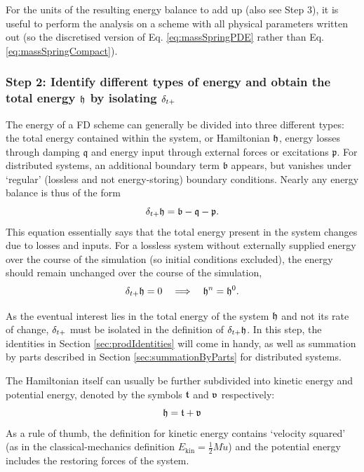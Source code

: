 {{For the units of the resulting energy balance to add up (also see Step 3), it is useful to perform the analysis on a scheme with all physical parameters written out (so the discretised version of Eq. \eqref{eq:massSpringPDE} rather than Eq. \eqref{eq:massSpringCompact}).

\subsubsection{Step 2: Identify different types of energy and obtain the total energy $\mathfrak{h}$ by isolating $\delta_{t+}$}
The energy of a FD scheme can generally be divided into three different types: the total energy contained within the system, or Hamiltonian $\mathfrak{h}$, energy losses through damping $\mathfrak{q}$ and energy input through external forces or excitations $\mathfrak{p}$. For distributed systems, an additional boundary term $\mathfrak{b}$ appears, but vanishes under `regular' (lossless and not energy-storing) boundary conditions. Nearly any energy balance is thus of the form 
\begin{equation}\label{eq:energyForm}
    \delta_{t+} \mathfrak{h} = \mathfrak{b}-\mathfrak{q} - \mathfrak{p}.
\end{equation}
This equation essentially says that the total energy present in the system changes due to losses and inputs. For a lossless system without externally supplied energy over the course of the simulation (so initial conditions excluded), the energy should remain unchanged over the course of the simulation, 
\begin{equation}\label{eq:unchangedEnergy}
    \delta_{t+} \mathfrak{h} = 0 \quad \Longrightarrow \quad \mathfrak{h}^n = \mathfrak{h}^0.
\end{equation}

As the eventual interest lies in the total energy of the system $\mathfrak{h}$ and not its rate of change, $\delta_{t+}$ must be isolated in the definition of $\delta_{t+} \mathfrak{h}$. In this step, the identities in Section \ref{sec:prodIdentities} will come in handy, as well as summation by parts described in Section \ref{sec:summationByParts} for distributed systems.
 
The Hamiltonian itself can usually be further subdivided into kinetic energy and potential energy, denoted by the symbols $\mathfrak{t}$ and $\mathfrak{v}$ respectively:
\begin{equation}
    \mathfrak{h} = \mathfrak{t} + \mathfrak{v}
\end{equation}
As a rule of thumb, the definition for kinetic energy contains `velocity squared' (as in the classical-mechanics definition $E_\text{kin}=\tfrac{1}{2}M\dot u$) and the potential energy includes the restoring forces of the system. 

}}
